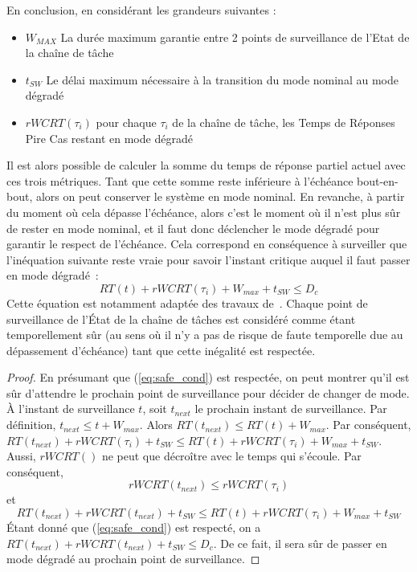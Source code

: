 \documentclass[french, a4paper, 11pt, twoside, pdftex]{StyleThese}
\begin{document}
	En conclusion, en considérant les grandeurs suivantes : 
	\begin{itemize}
		\item 	$ W_{MAX} $ La durée maximum garantie entre 2 points de surveillance de l'Etat de la chaîne de tâche
		\item 	$ t_{SW} $ Le délai maximum nécessaire à la transition du mode nominal au mode dégradé
		\item 	$ rWCRT(\tau_i) $ pour chaque $\tau_i$ de la chaîne de tâche, les Temps de Réponses Pire Cas restant en mode dégradé
	\end{itemize}
	Il est alors possible de calculer la somme du temps de réponse partiel actuel avec ces trois métriques. Tant que cette somme reste inférieure à l'échéance bout-en-bout, alors on peut conserver le système en mode nominal. En revanche, à partir du moment où cela dépasse l'échéance, alors c'est le moment où il n'est plus sûr de rester en mode nominal, et il faut donc déclencher le mode dégradé pour garantir le respect de l'échéance. Cela correspond en conséquence à surveiller que l'inéquation suivante reste vraie pour savoir l'instant critique auquel il faut passer en mode dégradé~:
	\begin{equation} \label{eq:safe_cond}
		RT(t) + rWCRT(\tau_i) + W_{max} + t_{SW} \leq D_c
	\end{equation} 
	Cette équation est notamment adaptée des travaux de~\cite{kritikakou_run-time_2014}. Chaque point de surveillance de l'État de la chaîne de tâches est considéré comme étant temporellement sûr (au sens où il n'y a pas de risque de faute temporelle due au dépassement d'échéance) tant que cette inégalité est respectée.
    
    \begin{proof}
		En présumant que (\ref{eq:safe_cond}) est respectée, on peut montrer qu'il est sûr d'attendre le prochain point de surveillance pour décider de changer de mode. \nline
		À l'instant de surveillance $t$, soit $t_{next}$ le prochain instant de surveillance.\nline
		Par définition, $t_{next} \leq t + W_{max}$. Alors $RT(t_{next}) \leq RT(t) + W_{max}$. 
		Par conséquent, \smallbreak
		$RT(t_{next}) + rWCRT(\tau_i) + t_{SW} \leq RT(t) + rWCRT(\tau_i) + W_{max} + t_{SW}$. \nline
		Aussi, $rWCRT()$ ne peut que décroître avec le temps qui s'écoule. Par conséquent, %
		\[ rWCRT(t_{next}) \leq rWCRT(\tau_i)	\]
		et 
		\[ RT(t_{next}) + rWCRT(t_{next}) + t_{SW} \leq RT(t) + rWCRT(\tau_i) + W_{max} + t_{SW} \] 
		Étant donné que (\ref{eq:safe_cond}) est respecté, on a $RT(t_{next}) + rWCRT(t_{next}) + t_{SW} \leq D_c$.
		De ce fait, il sera sûr de passer en mode dégradé au prochain point de surveillance.  
    \end{proof}
    
\end{document}
